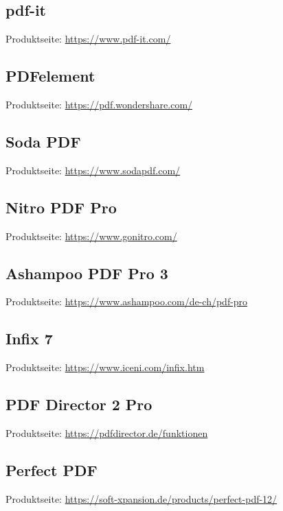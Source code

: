 \subsection{pdf-it}
Produktseite: \url{https://www.pdf-it.com/}

\subsection{PDFelement}
Produktseite: \url{https://pdf.wondershare.com/}

\subsection{Soda PDF}
Produktseite: \url{https://www.sodapdf.com/}

\subsection{Nitro PDF Pro}
Produktseite: \url{https://www.gonitro.com/}

\subsection{Ashampoo PDF Pro 3}
Produktseite: \url{https://www.ashampoo.com/de-ch/pdf-pro}

\subsection{Infix 7}
Produktseite: \url{https://www.iceni.com/infix.htm}

\subsection{PDF Director 2 Pro}
Produktseite: \url{https://pdfdirector.de/funktionen}

\subsection{Perfect PDF}
Produktseite: \url{https://soft-xpansion.de/products/perfect-pdf-12/}